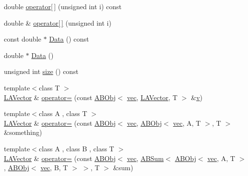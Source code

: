\begin{DoxyCompactItemize}
\item 
double \mbox{\hyperlink{classROOT_1_1Minuit2_1_1LAVector_a2ce4a54737c9a2b3097adb48bbe2913c}{operator\mbox{[}$\,$\mbox{]}}} (unsigned int i) const
\item 
double \& \mbox{\hyperlink{classROOT_1_1Minuit2_1_1LAVector_aae517a4a6bf31a2869591079b7af4b15}{operator\mbox{[}$\,$\mbox{]}}} (unsigned int i)
\item 
const double $\ast$ \mbox{\hyperlink{classROOT_1_1Minuit2_1_1LAVector_a22e21b176e4d63740045edb4c12fe0a3}{Data}} () const
\item 
double $\ast$ \mbox{\hyperlink{classROOT_1_1Minuit2_1_1LAVector_ad2685b4f4d71a3a68fcf447779dec718}{Data}} ()
\item 
unsigned int \mbox{\hyperlink{classROOT_1_1Minuit2_1_1LAVector_a145e47ac78c4fcace3209ef477255937}{size}} () const
\item 
{\footnotesize template$<$class T $>$ }\\\mbox{\hyperlink{classROOT_1_1Minuit2_1_1LAVector}{L\+A\+Vector}} \& \mbox{\hyperlink{classROOT_1_1Minuit2_1_1LAVector_aac656a7123178e44525885d0d5ab2e86}{operator=}} (const \mbox{\hyperlink{classROOT_1_1Minuit2_1_1ABObj}{A\+B\+Obj}}$<$ \mbox{\hyperlink{classROOT_1_1Minuit2_1_1vec}{vec}}, \mbox{\hyperlink{classROOT_1_1Minuit2_1_1LAVector}{L\+A\+Vector}}, T $>$ \&\mbox{\hyperlink{hadron__timeslice_8cc_a716fc87f5e814be3ceee2405ed6ff22a}{v}})
\item 
{\footnotesize template$<$class A , class T $>$ }\\\mbox{\hyperlink{classROOT_1_1Minuit2_1_1LAVector}{L\+A\+Vector}} \& \mbox{\hyperlink{classROOT_1_1Minuit2_1_1LAVector_a968511a119769ea707df72b17fc044c9}{operator=}} (const \mbox{\hyperlink{classROOT_1_1Minuit2_1_1ABObj}{A\+B\+Obj}}$<$ \mbox{\hyperlink{classROOT_1_1Minuit2_1_1vec}{vec}}, \mbox{\hyperlink{classROOT_1_1Minuit2_1_1ABObj}{A\+B\+Obj}}$<$ \mbox{\hyperlink{classROOT_1_1Minuit2_1_1vec}{vec}}, A, T $>$, T $>$ \&something)
\item 
{\footnotesize template$<$class A , class B , class T $>$ }\\\mbox{\hyperlink{classROOT_1_1Minuit2_1_1LAVector}{L\+A\+Vector}} \& \mbox{\hyperlink{classROOT_1_1Minuit2_1_1LAVector_a9ecf0f7d6cfc259fe0bb4589a060d7a3}{operator=}} (const \mbox{\hyperlink{classROOT_1_1Minuit2_1_1ABObj}{A\+B\+Obj}}$<$ \mbox{\hyperlink{classROOT_1_1Minuit2_1_1vec}{vec}}, \mbox{\hyperlink{classROOT_1_1Minuit2_1_1ABSum}{A\+B\+Sum}}$<$ \mbox{\hyperlink{classROOT_1_1Minuit2_1_1ABObj}{A\+B\+Obj}}$<$ \mbox{\hyperlink{classROOT_1_1Minuit2_1_1vec}{vec}}, A, T $>$, \mbox{\hyperlink{classROOT_1_1Minuit2_1_1ABObj}{A\+B\+Obj}}$<$ \mbox{\hyperlink{classROOT_1_1Minuit2_1_1vec}{vec}}, B, T $>$ $>$, T $>$ \&sum)

\end{DoxyCompactItemize}
